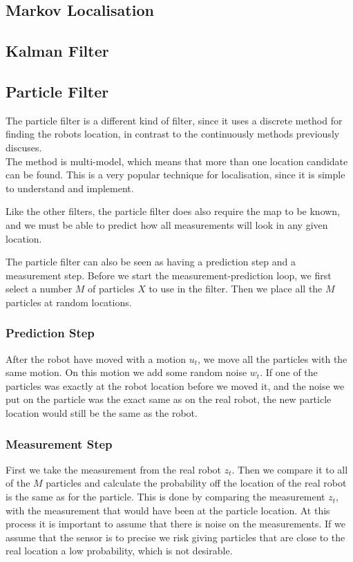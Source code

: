 \subsection{Markov Localisation}

\subsection{Kalman Filter}

\subsection{Particle Filter}
The particle filter is a different kind of filter, since it uses a discrete method for finding the robots location, in contrast to the continuously methods previously discuses. \\
The method is multi-model, which means that more than one location candidate can be found. This is a very popular technique for localisation, since it is simple to understand and implement. 

Like the other filters, the particle filter does also require the map to be known, and we must be able to predict how all measurements will look in any given location. 

The particle filter can also be seen as having a prediction step and a measurement step. Before we start the measurement-prediction loop, we first select a number $M$ of particles $X$ to use in the filter. Then we place all the $M$ particles at random locations. 

\subsubsection{Prediction Step}
After the robot have moved with a motion $u_t$, we move all the particles with the same motion. On this motion we add some random noise $w_t$. If one of the particles was exactly at the robot location before we moved it, and the noise we put on the particle was the exact same as on the real robot, the new particle location would still be the same as the robot.  

\subsubsection{Measurement Step}
First we take the measurement from the real robot $z_t$. Then we compare it to all of the $M$ particles and calculate the probability off the location of the real robot is the same as for the particle. This is done by comparing the measurement $z_t$, with the measurement that would have been at the particle location.
At this process it is important to assume that there is noise on the measurements. If we assume that the sensor is to precise we risk giving particles that are close to the real location a low probability, which is not desirable.

